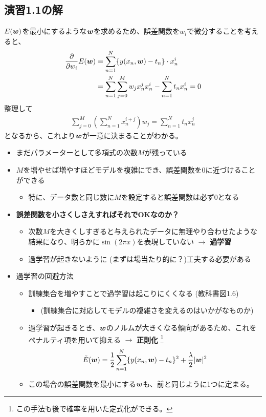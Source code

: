 \documentclass[a4j,11pt]{jarticle}
\def\v#1{\mbox{\boldmath $#1$}}
\def\pd#1#2{\frac{\partial #1}{\partial #2}}
\begin{document}
\subsection*{演習1.1の解}
$E(\v{w})$を最小にするような$\v{w}$を求めるため、誤差関数を$w_i$で微分することを考えると、
\begin{align*}
	\pd{}{w_i}E(\v{w}) &= \sum_{n=1}^{N}\{y(x_n, \v{w})-t_n\}\cdot x_n^{i} \nonumber \\
			&= \sum_{n=1}^{N}\sum_{j=0}^{M}w_j x_n^{j}x_n^{i} - \sum_{n=1}^{N}t_n x_n^{i} = 0
\end{align*}
整理して
\begin{align}
	\sum_{j=0}^{M}\left(\sum_{n=1}^N x_n^{i+j}\right)w_j = \sum_{n=1}^{N}t_nx_n^j
\end{align}
となるから、これより$\v{w}$が一意に決まることがわかる。
\begin{itemize}
		\item まだパラメーターとして多項式の次数$M$が残っている
		\item $M$を増やせば増やすほどモデルを複雑にでき、誤差関数を0に近づけることができる
			\begin{itemize}
				\item 特に、データ数と同じ数に$M$を設定すると誤差関数は必ず0となる
			\end{itemize}
		\item \textbf{誤差関数を小さくしさえすればそれでOKなのか？}
			\begin{itemize}
				\item 次数$M$を大きくしすぎると与えられたデータに無理やり合わせたような結果になり、明らかに$\sin(2\pi x)$を表現していない $\rightarrow$ \textbf{過学習}
				\item 過学習が起きないように (まずは場当たり的に？)工夫する必要がある
			\end{itemize}
		\item 過学習の回避方法
			\begin{itemize}
				\item 訓練集合を増やすことで過学習は起こりにくくなる (教科書図1.6)
					\begin{itemize}
						\item (訓練集合に対応してモデルの複雑さを変えるのはいかがなものか)
					\end{itemize}
				\item 過学習が起きるとき、$\v{w}$のノルムが大きくなる傾向があるため、これをペナルティ項を用いて抑える $\rightarrow$ \textbf{正則化}
					\footnote{この手法も後で確率を用いた定式化ができる。}
					\begin{align}
						\tilde{E}(\v{w}) = \frac{1}{2}\sum_{n=1}^{N}\{y(x_n, \v{w})-t_n\}^2+\frac{\lambda}{2}|\v{w}|^2
					\end{align}
				\item この場合の誤差関数を最小にする$\v{w}$も、前と同じように1つに定まる。
			\end{itemize}
\end{itemize}
\end{document}
